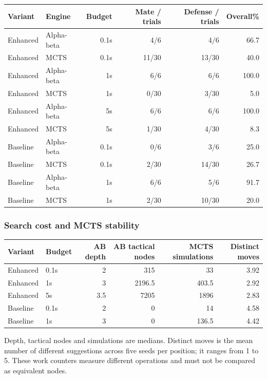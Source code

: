 \begin{center}\small
\begin{tabular}{llrrrr}\toprule
Variant & Engine & Budget & Mate / trials & Defense / trials & Overall\%\\\midrule
Enhanced & Alpha-beta & 0.1s & 4/6 & 4/6 & 66.7 \\
Enhanced & MCTS & 0.1s & 11/30 & 13/30 & 40.0 \\
Enhanced & Alpha-beta & 1s & 6/6 & 6/6 & 100.0 \\
Enhanced & MCTS & 1s & 0/30 & 3/30 & 5.0 \\
Enhanced & Alpha-beta & 5s & 6/6 & 6/6 & 100.0 \\
Enhanced & MCTS & 5s & 1/30 & 4/30 & 8.3 \\
Baseline & Alpha-beta & 0.1s & 0/6 & 3/6 & 25.0 \\
Baseline & MCTS & 0.1s & 2/30 & 14/30 & 26.7 \\
Baseline & Alpha-beta & 1s & 6/6 & 5/6 & 91.7 \\
Baseline & MCTS & 1s & 2/30 & 10/30 & 20.0 \\
\bottomrule\end{tabular}\end{center}
\subsubsection*{Search cost and MCTS stability}
\begin{center}\small\begin{tabular}{llrrrr}\toprule
Variant & Budget & AB depth & AB tactical nodes & MCTS simulations & Distinct moves\\\midrule
Enhanced & 0.1s & 2 & 315 & 33 & 3.92 \\
Enhanced & 1s & 3 & 2196.5 & 403.5 & 2.92 \\
Enhanced & 5s & 3.5 & 7205 & 1896 & 2.83 \\
Baseline & 0.1s & 2 & 0 & 14 & 4.58 \\
Baseline & 1s & 3 & 0 & 136.5 & 4.42 \\
\bottomrule\end{tabular}\end{center}
Depth, tactical nodes and simulations are medians. Distinct moves is the mean number
of different suggestions across five seeds per position; it ranges from 1 to 5.
These work counters measure different operations and must not be compared as equivalent nodes.
